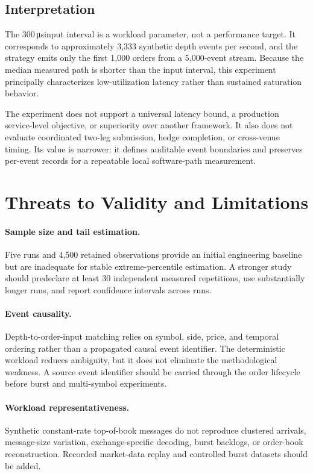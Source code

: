 \documentclass[11pt]{article}
\newcommand{\us}{\,\si{\micro\second}}
\begin{document}
\subsection{Interpretation}

The 300\us input interval is a workload parameter, not a performance target. It corresponds to approximately 3,333 synthetic depth events per second, and the strategy emits only the first 1,000 orders from a 5,000-event stream. Because the median measured path is shorter than the input interval, this experiment principally characterizes low-utilization latency rather than sustained saturation behavior.

The experiment does not support a universal latency bound, a production service-level objective, or superiority over another framework. It also does not evaluate coordinated two-leg submission, hedge completion, or cross-venue timing. Its value is narrower: it defines auditable event boundaries and preserves per-event records for a repeatable local software-path measurement.

\section{Threats to Validity and Limitations}

\paragraph{Sample size and tail estimation.}
Five runs and 4,500 retained observations provide an initial engineering baseline but are inadequate for stable extreme-percentile estimation. A stronger study should predeclare at least 30 independent measured repetitions, use substantially longer runs, and report confidence intervals across runs.

\paragraph{Event causality.}
Depth-to-order-input matching relies on symbol, side, price, and temporal ordering rather than a propagated causal event identifier. The deterministic workload reduces ambiguity, but it does not eliminate the methodological weakness. A source event identifier should be carried through the order lifecycle before burst and multi-symbol experiments.

\paragraph{Workload representativeness.}
Synthetic constant-rate top-of-book messages do not reproduce clustered arrivals, message-size variation, exchange-specific decoding, burst backlogs, or order-book reconstruction. Recorded market-data replay and controlled burst datasets should be added.
\end{document}
